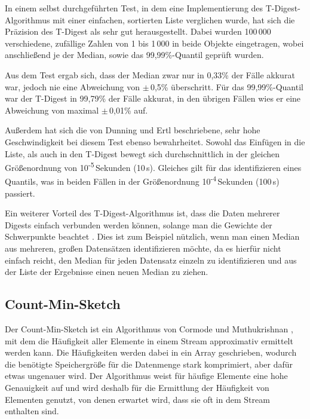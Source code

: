 In einem selbst durchgeführten Test, in dem eine Implementierung des T-Digest-Algorithmus mit einer einfachen, sortierten Liste verglichen wurde, hat sich die Präzision des T-Digest als sehr gut herausgestellt.
Dabei wurden 100\,000 verschiedene, zufällige Zahlen von 1 bis 1\,000 in beide Objekte eingetragen, wobei anschließend je der Median, sowie das 99,99\%-Quantil geprüft wurden.

Aus dem Test ergab sich, dass der Median zwar nur in 0,33\% der Fälle akkurat war, jedoch nie eine Abweichung von $\pm$\,0,5\% überschritt.
Für das 99,99\%-Quantil war der T-Digest in 99,79\% der Fälle akkurat, in den übrigen Fällen wies er eine Abweichung von maximal $\pm$\,0,01\% auf.

Außerdem hat sich die von Dunning und Ertl \cite{dunning2019} beschriebene, sehr hohe Geschwindigkeit bei diesem Test ebenso bewahrheitet.
Sowohl das Einfügen in die Liste, als auch in den T-Digest bewegt sich durchschnittlich in der gleichen Größenordnung von 10\textsuperscript{-5}\,Sekunden (10\,\textmu{}s).
Gleiches gilt für das identifizieren eines Quantils, was in beiden Fällen in der Größenordnung 10\textsuperscript{-4}\,Sekunden (100\,\textmu{}s) passiert.

Ein weiterer Vorteil des T-Digest-Algorithmus ist, dass die Daten mehrerer Digests einfach verbunden werden können, solange man die Gewichte der Schwerpunkte beachtet \cite{dunning2019}.
Dies ist zum Beispiel nützlich, wenn man einen Median aus mehreren, großen Datensätzen identifizieren möchte, da es hierfür nicht einfach reicht, den Median für jeden Datensatz einzeln zu identifizieren und aus der Liste der Ergebnisse einen neuen Median zu ziehen.


\subsection{Count-Min-Sketch}

Der Count-Min-Sketch ist ein Algorithmus von Cormode und Muthukrishnan \cite{cormode2005}, 
mit dem die Häufigkeit aller Elemente in einem Stream approximativ ermittelt werden kann. 
Die Häufigkeiten werden dabei in ein Array geschrieben, 
wodurch die benötigte Speichergröße für die Datenmenge stark komprimiert, 
aber dafür etwas ungenauer wird. 
Der Algorithmus weist für häufige Elemente eine hohe Genauigkeit auf 
und wird deshalb für die Ermittlung der Häufigkeit von Elementen genutzt, 
von denen erwartet wird, dass sie oft in dem Stream enthalten sind.

